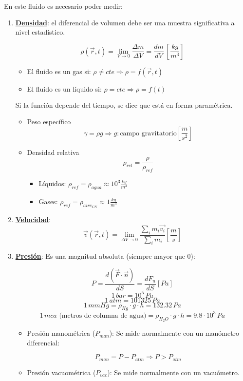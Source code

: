 En este fluido es necesario poder medir:
\begin{enumerate}
	\item \underline{\textbf{Densidad}}: el diferencial de volumen debe ser una muestra significativa a nivel estadístico.
	
	\[\rho(\vec{r},t)=\lim_{{V \to 0}} \frac{\Delta m}{\Delta V}=\frac{dm}{dV} \ \left[{\frac{kg}{m^3}}\right]\] 
	
	
	\begin{itemize}
		\item El fluido es un gas si: $\rho \neq cte \Rightarrow \rho=f(\vec{r},t)$
		\item El fluido es un líquido si: $\rho = cte \Rightarrow \rho=f(t)$
	\end{itemize}
	
	Si la función depende del tiempo, se dice que está en forma paramétrica.
	
	\begin{itemize}
		\item Peso específico
		\[\gamma=\rho g  \Rightarrow g: \text{campo gravitatorio} \left[{\frac{m}{s^2}}\right]\]
		\item Densidad relativa
		\[\rho_{rel}=\frac{\rho}{\rho_{ref}}\]
		
		\begin{itemize}
			\item Líquidos: $\rho_{ref}=\rho_{agua}\approx 10^3 \frac{kg}{m^3}$
				\item Gases: $\rho_{ref}=\rho_{aire_{CN}}\approx 1 \frac{kg}{m^3}$
		\end{itemize}
	\end{itemize}
		
	\item \underline{\textbf{Velocidad}}:
		\[\vec{v}(\vec{r},t)=\lim_{{\Delta V \to 0}} \frac{\sum_i m_i \vec{v_i}}{\sum_i m_i} \left[{\frac{m}{s}}\right]\]
	\item \underline{\textbf{Presión}}: Es una magnitud absoluta (siempre mayor que 0):
	
	\[P=\frac{d(\vec{F}\cdot\vec{n})}{dS} =\frac{d{F_n}}{dS} [Pa]\]
	\[1\,bar = 10^5\,Pa\]
	\[1\,atm = 101325\,Pa\]
	\[1\,mmHg =\rho_{Hg}\cdot g\cdot h=132.32\,Pa\]
	\[1\,mca\text{ (metros de columna de agua)} = \rho_{H_2O}\cdot g\cdot h=9.8\cdot 10^3\,Pa\]
	\begin{itemize}
		\item Presión manométrica ($P_{man}$): Se mide normalmente con un manómetro diferencial:
		
		\[P_{man} = P - P_{atm} \Rightarrow P>P_{atm}\]
		\item Presión vacuométrica ($P_{vac}$): Se mide normalmente con un vacuómetro.
		

\end{itemize}
\end{enumerate}
